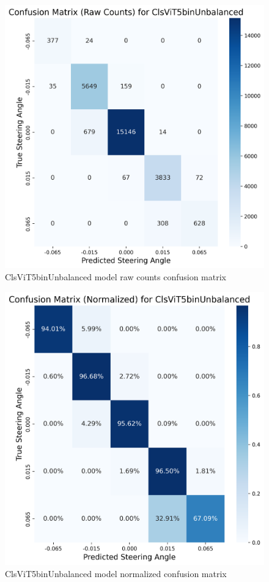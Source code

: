 \begin{figure}[H]
\centering
\includegraphics[width=0.65\linewidth]{Figures/Results/cm_raw_ClsViT5binUnbalanced.png}
\caption{ClsViT5binUnbalanced model raw counts confusion matrix}
\label{fig:cm_raw_ClsViT5binUnbalanced}
\end{figure}


\begin{figure}[H]
\centering
\includegraphics[width=0.65\linewidth]{Figures/Results/cm_norm_ClsViT5binUnbalanced.png}
\caption{ClsViT5binUnbalanced model normalized confusion matrix}
\label{fig:cm_norm_ClsViT5binUnbalanced}
\end{figure}


